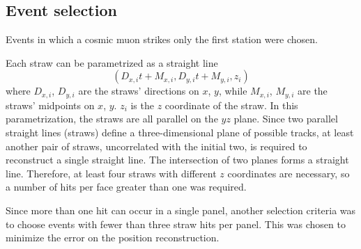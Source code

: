 \subsection{Event selection}\label{eventselection}
Events in which a cosmic muon strikes only the first station were chosen. 

Each straw can be parametrized as a straight line
\begin{equation}\label{equaretta}
    (D_{x,i}t+M_{x,i},D_{y,i}t+M_{y,i},z_i)
\end{equation}
where $D_{x,i}$, $D_{y,i}$ are the straws' directions on $x$, $y$, while $M_{x,i}$, $M_{y,i}$ are the straws' midpoints on $x$, $y$. $z_i$ is the $z$ coordinate of the straw.
In this parametrization, the straws are all parallel on the $yz$ plane.
Since two parallel straight lines (straws) define a three-dimensional plane of possible tracks, 
at least another pair of straws, uncorrelated with the initial two, is required to reconstruct a 
single straight line. The intersection of two planes forms a straight line. Therefore, at least four straws with different $z$ coordinates are necessary, 
so a number of hits per face greater than one was required.

Since more than one hit can occur in a single panel, another selection criteria 
was to choose events with fewer than three straw hits per panel. This was chosen to minimize the error on the position reconstruction.
